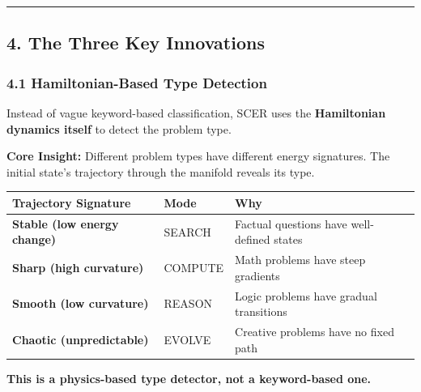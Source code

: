 \documentclass[
  11pt,
  a4paper,
]{article}
\begin{document}
\begin{center}\rule{0.5\linewidth}{0.5pt}\end{center}

\subsection{4. The Three Key
Innovations}\label{the-three-key-innovations}

\subsubsection{4.1 Hamiltonian-Based Type
Detection}\label{hamiltonian-based-type-detection}

Instead of vague keyword-based classification, SCER uses the
\textbf{Hamiltonian dynamics itself} to detect the problem type.

\textbf{Core Insight:} Different problem types have different energy
signatures. The initial state's trajectory through the manifold reveals
its type.

\begin{longtable}[]{@{}
  >{\raggedright\arraybackslash}p{}
  >{\raggedright\arraybackslash}p{}
  >{\raggedright\arraybackslash}p{}@{}}
\toprule\noalign{}
\begin{minipage}[b]{\linewidth}\raggedright
Trajectory Signature
\end{minipage} & \begin{minipage}[b]{\linewidth}\raggedright
Mode
\end{minipage} & \begin{minipage}[b]{\linewidth}\raggedright
Why
\end{minipage} \\
\midrule\noalign{}
\endhead
\bottomrule\noalign{}
\endlastfoot
\textbf{Stable (low energy change)} & SEARCH & Factual questions have
well-defined states \\
\textbf{Sharp (high curvature)} & COMPUTE & Math problems have steep
gradients \\
\textbf{Smooth (low curvature)} & REASON & Logic problems have gradual
transitions \\
\textbf{Chaotic (unpredictable)} & EVOLVE & Creative problems have no
fixed path \\
\end{longtable}

\textbf{This is a physics-based type detector, not a keyword-based one.}
\end{document}
